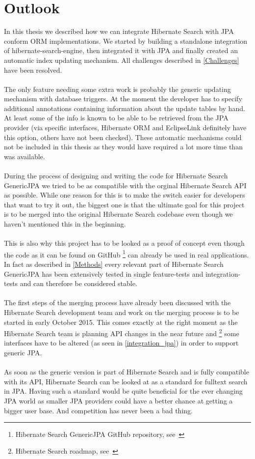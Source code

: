 \section{Outlook}\label{outlook}

In this thesis we described how we can integrate Hibernate Search with JPA conform ORM implementations. We started by building a standalone integration of hibernate-search-engine, then integrated it with JPA and finally created an automatic index updating mechanism. All challenges described in \ref{Challenges} have been resolved.
\\\\
The only feature needing some extra work is probably the generic updating mechanism with database triggers. At the moment the developer has to specify additional annotations containing information about the update tables by hand. At least some of the info is known to be able to be retrieved from the JPA provider (via specific interfaces, Hibernate ORM and EclipseLink definitely have this option, others have not been checked). These automatic mechanisms could not be included in this thesis as they would have required a lot more time than was available.
\\\\
During the process of designing and writing the code for Hibernate Search GenericJPA we tried to be as compatible with the orginal Hibernate Search API as possible. While one reason for this is to make the switch easier for developers that want to try it out, the biggest one is that the ultimate goal for this project is to be merged into the original Hibernate Search codebase even though we haven't mentioned this in the beginning.
\\\\
This is also why this project has to be looked as a proof of concept even though the code as it can be found on GitHub \footnote{Hibernate Search GenericJPA GitHub repository, see~\cite{hibernate_genericjpa_github}} can already be used in real applications. In fact as described in \ref{Methods} every relevant part of Hibernate Search GenericJPA has been extensively tested in single feature-tests and integration-tests and can therefore be considered stable. 
\\\\
The first steps of the merging process have already been discussed with the Hibernate Search development team and work on the merging process is to be started in early October 2015. This comes exactly at the right moment as the Hibernate Search team is planning API changes in the near future and \footnote{Hibernate Search roadmap, see~\cite{hibernate_search_roadmap}} some interfaces have to be altered (as seen in \ref{integration_jpa}) in order to support generic JPA.
\\\\
As soon as the generic version is part of Hibernate Search and is fully compatible with its API, Hibernate Search can be looked at as a standard for fulltext search in JPA. Having such a standard would be quite beneficial for the ever changing JPA world as smaller JPA providers could have a better chance at getting a bigger user base. And competition has never been a bad thing.